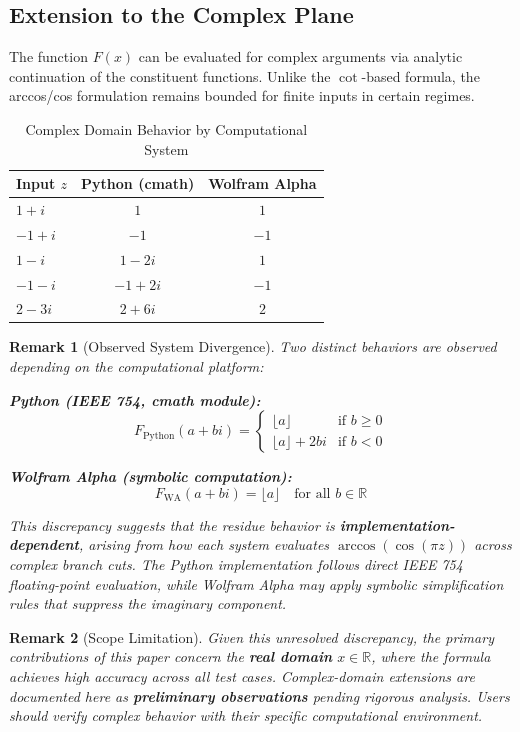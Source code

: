 \documentclass[12pt, a4paper]{article}
\theoremstyle{note}
\newtheorem{remark}{Remark}[section]
\newcommand{\Real}{\mathbb{R}}
\begin{document}
\subsection{Extension to the Complex Plane}

The function $F(x)$ can be evaluated for complex arguments via analytic continuation of the constituent functions. Unlike the $\cot$-based formula, the arccos/cos formulation remains bounded for finite inputs in certain regimes.

\begin{table}[h!]
\centering
\caption{Complex Domain Behavior by Computational System}
\begin{tabular}{l|c|c}
Input $z$ & Python (cmath) & Wolfram Alpha \\ \hline
$1 + i$ & $1$ & $1$ \\
$-1 + i$ & $-1$ & $-1$ \\
$1 - i$ & $1 - 2i$ & $1$ \\
$-1 - i$ & $-1 + 2i$ & $-1$ \\
$2 - 3i$ & $2 + 6i$ & $2$ \\
\end{tabular}
\end{table}

\begin{remark}[Observed System Divergence]\label{rem:system_divergence}
Two distinct behaviors are observed depending on the computational platform:

\textbf{Python (IEEE 754, cmath module):}
\[
F_{\text{Python}}(a + bi) = 
\begin{cases} 
\lfloor a \rfloor & \text{if } b \geq 0 \\
\lfloor a \rfloor + 2bi & \text{if } b < 0
\end{cases}
\]

\textbf{Wolfram Alpha (symbolic computation):}
\[
F_{\text{WA}}(a + bi) = \lfloor a \rfloor \quad \text{for all } b \in \Real
\]

This discrepancy suggests that the residue behavior is \textbf{implementation-dependent}, arising from how each system evaluates $\arccos(\cos(\pi z))$ across complex branch cuts. The Python implementation follows direct IEEE 754 floating-point evaluation, while Wolfram Alpha may apply symbolic simplification rules that suppress the imaginary component.
\end{remark}

\begin{remark}[Scope Limitation]\label{rem:complex_limitation}
Given this unresolved discrepancy, the primary contributions of this paper concern the \textbf{real domain} $x \in \Real$, where the formula achieves high accuracy across all test cases. Complex-domain extensions are documented here as \textbf{preliminary observations} pending rigorous analysis. Users should verify complex behavior with their specific computational environment.
\end{remark}
\end{document}
